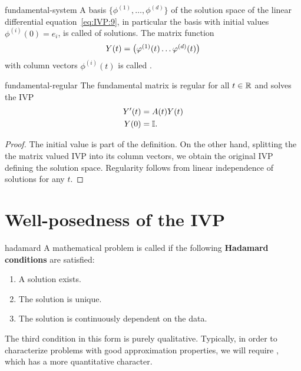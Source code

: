 
\begin{Definition}{fundamental-system}
  A basis $\{\phi^{(1)},\dots,\phi^{(d)}\}$ of the solution space of
  the linear differential equation~\eqref{eq:IVP:9}, in particular the
  basis with initial values $\phi^{(i)}(0) = e_i$, is called
   of solutions.  The
  matrix function
  \begin{gather}
    \label{eq:IVP:12}
    Y(t) =
    \begin{pmatrix}
      \varphi^{(1)}(t)\dots\varphi^{(d)}(t)
    \end{pmatrix}
  \end{gather}
  with column vectors $\phi^{(i)}(t)$ is called
  .
\end{Definition}

\begin{Corollary}{fundamental-regular}
  The fundamental matrix is regular for all $t\in \mathbb R$ and solves the
  IVP
  \begin{align*}
    Y'(t) &= A(t)Y(t)\\
    Y (0) &= \mathbb I.
  \end{align*}
\end{Corollary}

\begin{proof}
  The initial value is part of the definition. On the other hand,
  splitting the the matrix valued IVP into its column vectors, we
  obtain the original IVP defining the solution space. Regularity
  follows from linear independence of solutions for any $t$.
\end{proof}

\section{Well-posedness of the IVP}
\label{sec:IVP:well-posedness}


\begin{Definition}{hadamard} 
  A mathematical problem is called  if the
  following \textbf{Hadamard conditions} are satisfied:
  \begin{enumerate}
  \item A solution exists.
  \item The solution is unique.
  \item The solution is continuously dependent on the data.
  \end{enumerate}
  The third condition in this form is purely qualitative. Typically,
  in order to characterize problems with good approximation
  properties, we will require , which
  has a more quantitative character.
\end{Definition}

